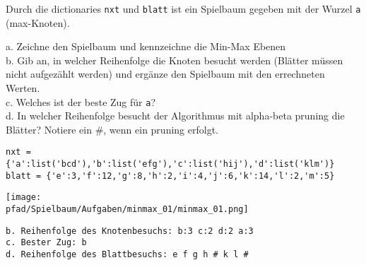 \question[6]
Durch die dictionaries \texttt{nxt} und \texttt{blatt} ist ein Spielbaum
 gegeben mit der Wurzel \texttt{a} (max-Knoten).

a. Zeichne den Spielbaum und kennzeichne die Min-Max Ebenen \\
b. Gib an, in welcher Reihenfolge die Knoten besucht werden (Blätter müssen nicht aufgezählt werden)
 und ergänze den Spielbaum mit den errechneten Werten. \\
c. Welches ist der beste Zug für \texttt{a}? \\
d. In welcher Reihenfolge besucht der Algorithmus mit alpha-beta pruning die Blätter? Notiere ein \#, wenn
ein pruning erfolgt.

\begin{lstlisting}
nxt = {'a':list('bcd'),'b':list('efg'),'c':list('hij'),'d':list('klm')}
blatt = {'e':3,'f':12,'g':8,'h':2,'i':4,'j':6,'k':14,'l':2,'m':5}
\end{lstlisting}
\begin{solutionbox}{10cm}
\texttt{[image: \\pfad/Spielbaum/Aufgaben/minmax\_01/minmax\_01.png]}
\begin{lstlisting}
b. Reihenfolge des Knotenbesuchs: b:3 c:2 d:2 a:3
c. Bester Zug: b
d. Reihenfolge des Blattbesuchs: e f g h # k l #
\end{lstlisting}
\end{solutionbox}
